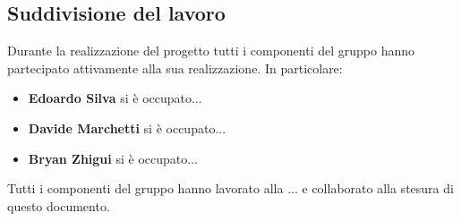 \documentclass[11pt,italian]{article}
\begin{document}
\subsection{Suddivisione del lavoro}
Durante la realizzazione del progetto tutti i componenti del gruppo hanno partecipato attivamente alla sua realizzazione. In particolare:
\begin{itemize}
  \item \textbf{Edoardo Silva} si è occupato...
  \item \textbf{Davide Marchetti} si è occupato...
  \item \textbf{Bryan Zhigui} si è occupato...
\end{itemize}

\noindent
Tutti i componenti del gruppo hanno lavorato alla ... e collaborato alla stesura di questo documento.
\end{document}
